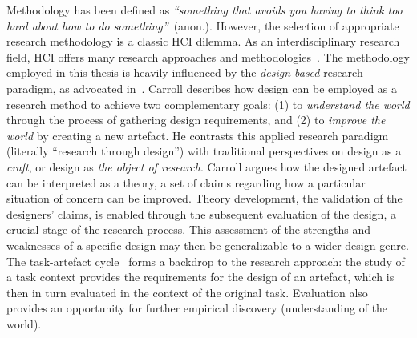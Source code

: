 
Methodology has been defined as \textit{``something that avoids you having to think too hard about how to do something''}~(anon.). %
However, the selection of appropriate research methodology is a classic HCI dilemma.  As an interdisciplinary research field, HCI offers many research approaches and methodologies~\citep{Sasse:97}.
The methodology employed in this thesis is heavily influenced by the \textit{design-based} research paradigm, as advocated in~\citet{Carroll:00}.  Carroll describes how design can be employed as a research method to achieve two complementary goals: (1) to \textit{understand the world} through the process of gathering design requirements, and (2) to \textit{improve the world} by creating a new artefact.  He contrasts this applied research paradigm (literally ``research through design'') with traditional perspectives on design as a \textit{craft}, or design as \textit{the object of research}.  Carroll argues how the designed artefact can be interpreted as a theory, a set of claims regarding how a particular situation of concern can be improved.  Theory development, the validation of the designers' claims, is enabled through the subsequent evaluation of the design, a crucial stage of the research process.  This assessment of the strengths and weaknesses of a specific design may then be generalizable to a wider design genre. The task-artefact cycle~\citep{Carroll-cycle:91} forms a backdrop to the research approach: the study of a task context provides the requirements for the design of an artefact, which is then in turn evaluated in the context of the original task.  Evaluation also provides an opportunity for further empirical discovery (understanding of the world).


